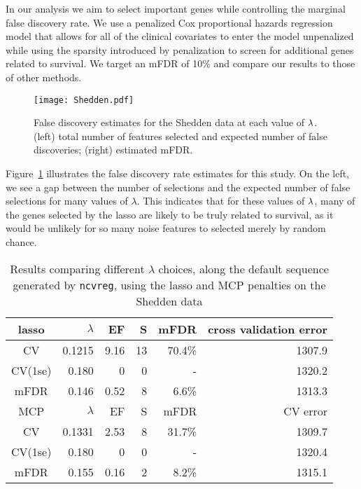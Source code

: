 In our analysis we aim to select important genes while controlling the marginal false discovery rate.  We use a penalized Cox proportional hazards regression model that allows for all of the clinical covariates to enter the model unpenalized while using the sparsity introduced by penalization to screen for additional genes related to survival.  We target an mFDR of 10\% and compare our results to those of other methods.

\begin{figure} [!htb]
 \centering
  \texttt{[image: Shedden.pdf]}
  \caption{\label{Fig:Shedden} False discovery estimates for the Shedden data at each value of $\lambda$.  (left) total number of features selected and expected number of false discoveries; (right) estimated mFDR.}
\end{figure}

Figure~\ref{Fig:Shedden} illustrates the false discovery rate estimates for this study.  On the left, we see a gap between the number of selections and the expected number of false selections for many values of $\lambda$.  This indicates that for these values of $\lambda$, many of the genes selected by the lasso are likely to be truly related to survival, as it would be unlikely for so many noise features to selected merely by random chance.

\begin{table}[htb!]
\centering
\begin{tabular}{c | r r r r r }
  \hline
lasso & $\lambda$ & EF & S & mFDR & cross validation error \\ 
	\hline
	CV & 0.1215 & 9.16 & 13 & 70.4\% &  1307.9 \\
	CV(1se) & 0.180  &  0 &  0 &  -  & 1320.2 \\
	mFDR & 0.146 & 0.52 & 8 & 6.6\% & 1313.3 \\
\hline
MCP & $\lambda$ & EF & S & mFDR  & CV error \\
	\hline
	CV & 0.1331 & 2.53 & 8 & 31.7\% &  1309.7 \\
	CV(1se) & 0.180 & 0 & 0 & - &  1320.4 \\
	mFDR & 0.155 & 0.16 & 2 & 8.2\% &  1315.1 \\
		\hline
\end{tabular}
\caption{\label{Tab:shedden} Results comparing different $\lambda$ choices, along the default sequence generated by {\tt ncvreg}, using the lasso and MCP penalties on the Shedden data }
\end{table}

